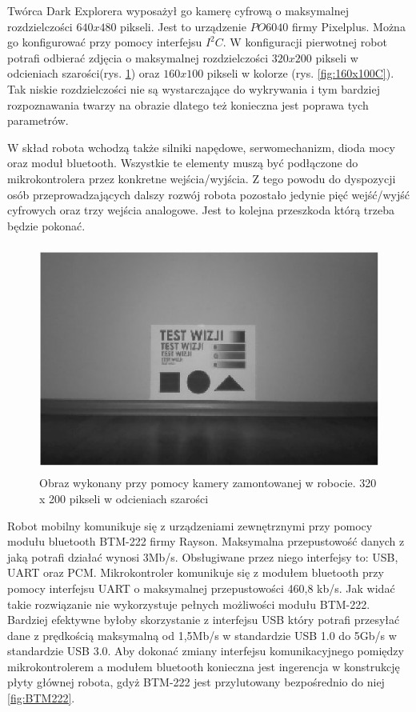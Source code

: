 Twórca Dark Explorera wyposażył go kamerę cyfrową o maksymalnej rozdzielczości $640x480$ pikseli. Jest to urządzenie $PO6040$ firmy Pixelplus. Można go konfigurować przy pomocy interfejsu $I^{2}C$. W konfiguracji pierwotnej robot potrafi odbierać zdjęcia o maksymalnej rozdzielczości $320x200$ pikseli w odcieniach szarości(rys. \ref{fig:320x200BW}) oraz $160x100$ pikseli w kolorze (rys. \ref{fig:160x100C}). Tak niskie rozdzielczości nie są wystarczające do wykrywania i tym bardziej rozpoznawania twarzy na obrazie dlatego też konieczna jest poprawa tych parametrów.

W skład robota wchodzą także silniki napędowe, serwomechanizm, dioda mocy oraz moduł bluetooth. Wszystkie te elementy muszą być podłączone do mikrokontrolera przez konkretne wejścia/wyjścia. Z tego powodu do dyspozycji osób przeprowadzających dalszy rozwój robota pozostało jedynie pięć wejść/wyjść cyfrowych oraz trzy wejścia analogowe. Jest to kolejna przeszkoda którą trzeba będzie pokonać.

\begin{figure}[!ht]
 \centering
 \includegraphics[height=75mm]{../images/ch02/320x200B&W.jpg}
 \caption{Obraz wykonany przy pomocy kamery zamontowanej w robocie. 320 x 200 pikseli w odcieniach szarości \cite{KmakMScThesis2009}}
 \label{fig:320x200BW}
\end{figure}

Robot mobilny komunikuje się z urządzeniami zewnętrznymi przy pomocy modułu bluetooth BTM-222 firmy Rayson. Maksymalna przepustowość danych z jaką potrafi działać wynosi 3Mb/s. Obsługiwane przez niego interfejsy to: USB, UART oraz PCM. Mikrokontroler komunikuje się z modułem bluetooth przy pomocy interfejsu UART o maksymalnej przepustowości 460,8 kb/s. Jak widać takie rozwiązanie nie wykorzystuje pełnych możliwości modułu BTM-222. Bardziej efektywne byłoby skorzystanie z interfejsu USB który potrafi przesyłać dane z prędkością maksymalną od 1,5Mb/s w standardzie USB 1.0 do 5Gb/s w standardzie USB 3.0. Aby dokonać zmiany interfejsu komunikacyjnego pomiędzy mikrokontrolerem a modułem bluetooth konieczna jest ingerencja w konstrukcję płyty głównej robota, gdyż BTM-222 jest przylutowany bezpośrednio do niej \ref{fig:BTM222}.

